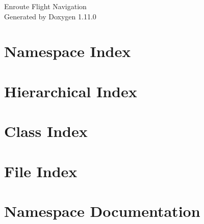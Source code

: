 \documentclass[twoside]{book}
\newcommand{\+}{\discretionary{\mbox{\scriptsize$\hookleftarrow$}}{}{}}
\newcommand{\clearemptydoublepage}{%
    \newpage{\pagestyle{empty}\cleardoublepage}%
  }
\begin{document}
  \raggedbottom
    \hypersetup{pageanchor=false,
                bookmarksnumbered=true,
                pdfencoding=unicode
               }
  \begin{titlepage}
  \vspace*{7cm}
  \begin{center}%
  {\Large Enroute Flight Navigation}\\
  \vspace*{1cm}
  {\large Generated by Doxygen 1.11.0}\\
  \end{center}
  \end{titlepage}
  \clearemptydoublepage
  \tableofcontents
  \clearemptydoublepage
  \hypersetup{pageanchor=true}

\chapter{Namespace Index}

\chapter{Hierarchical Index}

\chapter{Class Index}

\chapter{File Index}

\chapter{Namespace Documentation}


\end{document}
